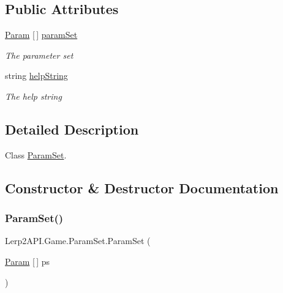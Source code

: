\subsection*{Public Attributes}
\begin{DoxyCompactItemize}
\item 
\hyperlink{class_lerp2_a_p_i_1_1_game_1_1_param}{Param} \mbox{[}$\,$\mbox{]} \hyperlink{class_lerp2_a_p_i_1_1_game_1_1_param_set_a7805f58beae9b1f9aafbcb233341c212}{param\+Set}
\begin{DoxyCompactList}\small\item\em The parameter set \end{DoxyCompactList}\item 
string \hyperlink{class_lerp2_a_p_i_1_1_game_1_1_param_set_a29904c3b8e98ce7bfb16a982d0536f80}{help\+String}
\begin{DoxyCompactList}\small\item\em The help string \end{DoxyCompactList}\end{DoxyCompactItemize}


\subsection{Detailed Description}
Class \hyperlink{class_lerp2_a_p_i_1_1_game_1_1_param_set}{Param\+Set}. 



\subsection{Constructor \& Destructor Documentation}
\mbox{\label{class_lerp2_a_p_i_1_1_game_1_1_param_set_afca36df5dfdfc4de70db033a8714eca5}} 
\subsubsection{\texorpdfstring{Param\+Set()}{ParamSet()}\hspace{0.1cm}{\footnotesize\ttfamily [1/2]}}
{\footnotesize\ttfamily Lerp2\+A\+P\+I.\+Game.\+Param\+Set.\+Param\+Set (\begin{DoxyParamCaption}\item[{\hyperlink{class_lerp2_a_p_i_1_1_game_1_1_param}{Param} \mbox{[}$\,$\mbox{]}}]{ps }\end{DoxyParamCaption})\hspace{0.3cm}{\ttfamily [inline]}}



